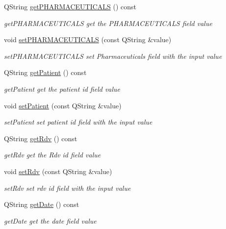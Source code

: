 \begin{DoxyCompactItemize}
Q\+String \mbox{\hyperlink{class_state_a2b63ae87a83465d6f8fae8c2ad109c15}{get\+P\+H\+A\+R\+M\+A\+C\+E\+U\+T\+I\+C\+A\+LS}} () const
\begin{DoxyCompactList}\small\item\em get\+P\+H\+A\+R\+M\+A\+C\+E\+U\+T\+I\+C\+A\+LS get the P\+H\+A\+R\+M\+A\+C\+E\+U\+T\+I\+C\+A\+LS field value \end{DoxyCompactList}\item 
void \mbox{\hyperlink{class_state_aa494c330e398a6477699b7a3890a6d4f}{set\+P\+H\+A\+R\+M\+A\+C\+E\+U\+T\+I\+C\+A\+LS}} (const Q\+String \&value)
\begin{DoxyCompactList}\small\item\em set\+P\+H\+A\+R\+M\+A\+C\+E\+U\+T\+I\+C\+A\+LS set Pharmaceuticals field with the input value \end{DoxyCompactList}\item 
Q\+String \mbox{\hyperlink{class_state_a7743f5db2b54ebf32d8a319b665bccda}{get\+Patient}} () const
\begin{DoxyCompactList}\small\item\em get\+Patient get the patient id field value \end{DoxyCompactList}\item 
void \mbox{\hyperlink{class_state_a47652011d60fd6cc7ff03f8623b37773}{set\+Patient}} (const Q\+String \&value)
\begin{DoxyCompactList}\small\item\em set\+Patient set patient id field with the input value \end{DoxyCompactList}\item 
Q\+String \mbox{\hyperlink{class_state_a76a40e5234b701cadfbc69d72b8a0a04}{get\+Rdv}} () const
\begin{DoxyCompactList}\small\item\em get\+Rdv get the Rdv id field value \end{DoxyCompactList}\item 
void \mbox{\hyperlink{class_state_a20029d32d294b2dcda3569ce5e512433}{set\+Rdv}} (const Q\+String \&value)
\begin{DoxyCompactList}\small\item\em set\+Rdv set rdv id field with the input value \end{DoxyCompactList}\item 
Q\+String \mbox{\hyperlink{class_state_a79d251bdbc65d2611d4281bf2eb5aa84}{get\+Date}} () const
\begin{DoxyCompactList}\small\item\em get\+Date get the date field value \end{DoxyCompactList}\item 

\end{DoxyCompactItemize}
